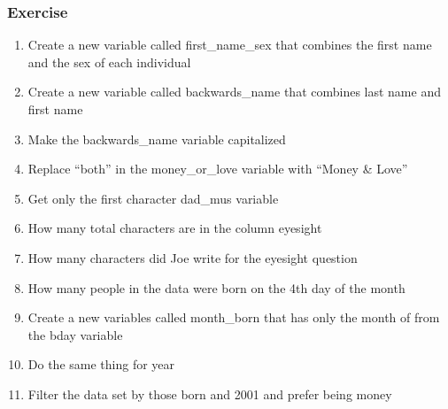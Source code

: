 \documentclass[
]{book}
\newenvironment{Shaded}{\begin{snugshade}}{\end{snugshade}}
\newcommand{\CommentTok}[1]{\textcolor[rgb]{0.56,0.35,0.01}{\textit{#1}}}
\newcommand{\KeywordTok}[1]{\textcolor[rgb]{0.13,0.29,0.53}{\textbf{#1}}}
\newcommand{\NormalTok}[1]{#1}
\newcommand{\OperatorTok}[1]{\textcolor[rgb]{0.81,0.36,0.00}{\textbf{#1}}}
\newcommand{\StringTok}[1]{\textcolor[rgb]{0.31,0.60,0.02}{#1}}
\begin{document}
\begin{Shaded}
\end{Shaded}

\hypertarget{exercise-8}{%
\subsubsection*{Exercise}\label{exercise-8}}

\begin{enumerate}
\def\labelenumi{\arabic{enumi})}
\item
  Create a new variable called first\_name\_sex that combines the first name and the sex of each individual
\item
  Create a new variable called backwards\_name that combines last name and first name
\item
  Make the backwards\_name variable capitalized
\item
  Replace ``both'' in the money\_or\_love variable with ``Money \& Love''
\item
  Get only the first character dad\_mus variable
\item
  How many total characters are in the column eyesight
\item
  How many characters did Joe write for the eyesight question
\item
  How many people in the data were born on the 4th day of the month
\item
  Create a new variables called month\_born that has only the month of from the bday variable
\item
  Do the same thing for year
\item
  Filter the data set by those born and 2001 and prefer being money
\end{enumerate}
\end{document}
